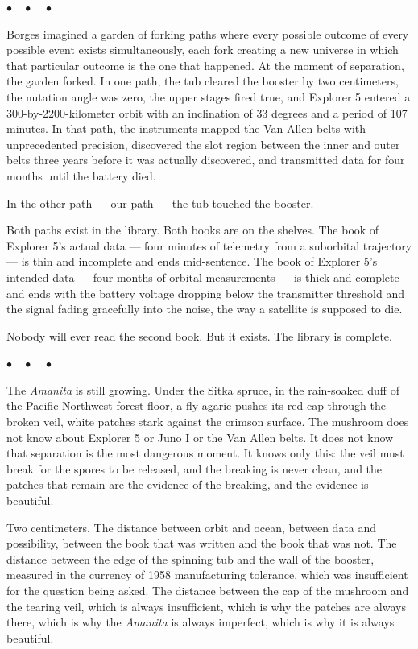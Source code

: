\documentclass[12pt, letterpaper]{article}
\begin{document}
\begin{center}
$\bullet\quad\bullet\quad\bullet$
\end{center}

Borges imagined a garden of forking paths where every possible outcome of every possible event exists simultaneously, each fork creating a new universe in which that particular outcome is the one that happened. At the moment of separation, the garden forked. In one path, the tub cleared the booster by two centimeters, the nutation angle was zero, the upper stages fired true, and Explorer 5 entered a 300-by-2200-kilometer orbit with an inclination of 33 degrees and a period of 107 minutes. In that path, the instruments mapped the Van Allen belts with unprecedented precision, discovered the slot region between the inner and outer belts three years before it was actually discovered, and transmitted data for four months until the battery died.

In the other path --- our path --- the tub touched the booster.

Both paths exist in the library. Both books are on the shelves. The book of Explorer 5's actual data --- four minutes of telemetry from a suborbital trajectory --- is thin and incomplete and ends mid-sentence. The book of Explorer 5's intended data --- four months of orbital measurements --- is thick and complete and ends with the battery voltage dropping below the transmitter threshold and the signal fading gracefully into the noise, the way a satellite is supposed to die.

Nobody will ever read the second book. But it exists. The library is complete.

\begin{center}
$\bullet\quad\bullet\quad\bullet$
\end{center}

The \textit{Amanita} is still growing. Under the Sitka spruce, in the rain-soaked duff of the Pacific Northwest forest floor, a fly agaric pushes its red cap through the broken veil, white patches stark against the crimson surface. The mushroom does not know about Explorer 5 or Juno I or the Van Allen belts. It does not know that separation is the most dangerous moment. It knows only this: the veil must break for the spores to be released, and the breaking is never clean, and the patches that remain are the evidence of the breaking, and the evidence is beautiful.

Two centimeters. The distance between orbit and ocean, between data and possibility, between the book that was written and the book that was not. The distance between the edge of the spinning tub and the wall of the booster, measured in the currency of 1958 manufacturing tolerance, which was insufficient for the question being asked. The distance between the cap of the mushroom and the tearing veil, which is always insufficient, which is why the patches are always there, which is why the \textit{Amanita} is always imperfect, which is why it is always beautiful.
\end{document}
